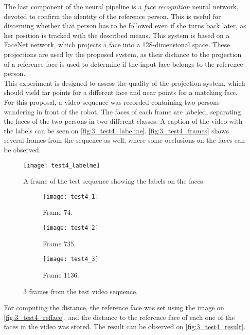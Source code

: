 The last component of the neural pipeline is a \textit{face recognition} neural network, devoted to confirm the identity of the reference person. This is useful for discerning whether that person has to be followed even if she turns back later, as her position is tracked with the described means. This system is based on a FaceNet \cite{facenet} network, which projects a face into a 128-dimensional space. These projections are used by the proposed system, as their distance to the projection of a reference face is used to determine if the input face belongs to the reference person.\\

This experiment is designed to assess the quality of the projection system, which should yield far points for a different face and near points for a matching face. For this proposal, a video sequence was recorded containing two persons wandering in front of the robot. The faces of each frame are labeled, separating the faces of the two persons in two different classes. A caption of the video with the labels can be seen on \autoref{fig:3_test4_labelme}. \autoref{fig:3_test4_frames} shows several frames from the sequence as well, where some occlusions on the faces can be observed. 

\begin{figure}[h]
	\centering
	\texttt{[image: test4\_labelme]}
	\caption{A frame of the test sequence showing the labels on the faces.}
	\label{fig:3_test4_labelme}
\end{figure}



\begin{figure}[h]
	\centering
	\begin{subfigure}[b]{0.3\linewidth}
		\centering
		\texttt{[image: test4\_1]}
		\caption{Frame 74.}
	\end{subfigure}
	\begin{subfigure}[b]{0.3\linewidth}
		\centering
		\texttt{[image: test4\_2]}
		\caption{Frame 735.}
	\end{subfigure}
	\begin{subfigure}[b]{0.3\linewidth}
		\centering
		\texttt{[image: test4\_3]}
		\caption{Frame 1136.}
	\end{subfigure}
	\caption{3 frames from the test video sequence.}
	\label{fig:3_test4_frames}
\end{figure}


For computing the distance, the reference face was set using the image on \autoref{fig:3_test4_refface}, and the distance to the reference face of each one of the faces in the video was stored. The result can be observed on \autoref{fig:3_test4_result}.


